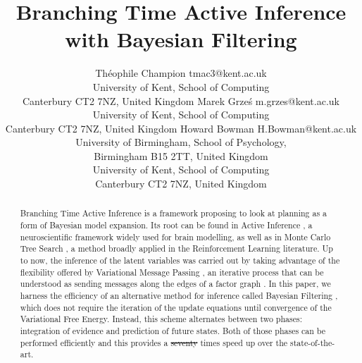 \documentclass[twoside,11pt]{article}
\providecommand{\DIFadd}[1]{{\protect\color{blue}\uwave{#1}}} %
\providecommand{\DIFdel}[1]{{\protect\color{red}\sout{#1}}}                      %
\providecommand{\DIFaddbegin}{} %
\providecommand{\DIFaddend}{} %
\providecommand{\DIFdelbegin}{} %
\providecommand{\DIFdelend}{} %
\begin{document}
\title{Branching Time Active Inference with Bayesian Filtering}

\author{\name Théophile Champion \email tmac3@kent.ac.uk \\
       \addr University of Kent, School of Computing\\
       Canterbury CT2 7NZ, United Kingdom
       \AND
       \name Marek Grze\'s \email m.grzes@kent.ac.uk \\
       \addr University of Kent, School of Computing\\
       Canterbury CT2 7NZ, United Kingdom
       \AND
       \name Howard Bowman \email H.Bowman@kent.ac.uk \\
       \addr University of Birmingham, School of Psychology,\\
       Birmingham B15 2TT, United Kingdom\\
       University of Kent, School of Computing\\
       Canterbury CT2 7NZ, United Kingdom
       }


\maketitle

\begin{abstract}%
Branching Time Active Inference \citep{AITS_THEORY,AITS_PRACTICE} is a framework proposing to look at planning as a form of Bayesian model expansion. Its root can be found in Active Inference \citep{FRISTON2016862,AI_TUTO,AI_VMP}, a neuroscientific framework widely used for brain modelling, as well as in Monte Carlo Tree Search \citep{6145622}, a method broadly applied in the Reinforcement Learning literature. Up to now, the inference of the latent variables was carried out by taking advantage of the flexibility offered by Variational Message Passing \citep{VMP_TUTO}, an iterative process that can be understood as sending messages along the edges of a factor graph \citep{FFG_TUTO}. In this paper, we harness the efficiency of an alternative method for inference called Bayesian Filtering \citep{BAYESIAN_FILTERING}, which does not require the iteration of the update equations until convergence of the Variational Free Energy. Instead, this scheme alternates between two phases: integration of evidence and prediction of future states. Both of those phases can be performed efficiently and this provides a \DIFdelbegin \DIFdel{seventy }\DIFdelend \DIFaddbegin \DIFadd{forty }\DIFaddend times speed up over the state-of-the-art.
\end{abstract}
\end{document}
